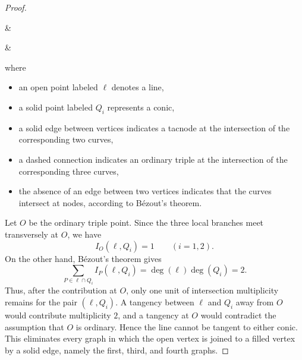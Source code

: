 \documentclass[11pt]{article}
\theoremstyle{plain}
\theoremstyle{definition}
\begin{document}
\begin{proof}
\begin{table}[h!]
\begin{tabular}
 &
             &
\end{tabular}
\end{table}

\noindent
where 
\begin{itemize}
    \item an open point labeled $\ell$ denotes a line,
    \item a solid point labeled $Q_i$ represents a conic,
    \item a solid edge between vertices indicates a tacnode at the intersection of the corresponding two curves,
    \item a dashed connection indicates an ordinary triple at the intersection of the corresponding three curves,
    \item the absence of an edge between two vertices indicates that the curves intersect at nodes, according to B\'ezout's theorem.
\end{itemize}
Let $O$ be the ordinary triple point. Since the three local branches meet transversely at $O$, we have
\[
I_O(\ell,Q_i)=1\qquad (i=1,2).
\]
On the other hand, B\'ezout's theorem gives
\[
\sum_{P\in \ell\cap Q_i} I_P(\ell,Q_i)=\deg(\ell)\deg(Q_i)=2.
\]
Thus, after the contribution at $O$, only one unit of intersection multiplicity remains for the pair $(\ell,Q_i)$. A tangency between $\ell$ and $Q_i$ away from $O$ would contribute multiplicity $2$, and a tangency at $O$ would contradict the assumption that $O$ is ordinary. Hence the line cannot be tangent to either conic. This eliminates every graph in which the open vertex is joined to a filled vertex by a solid edge, namely the first, third, and fourth graphs.


\end{proof}
\end{document}
